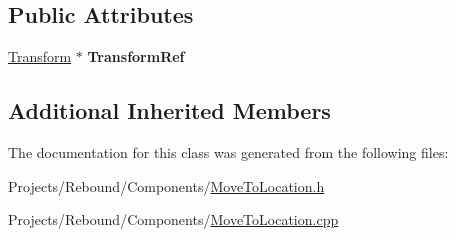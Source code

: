 \subsection*{Public Attributes}
\begin{DoxyCompactItemize}
\item 
\hypertarget{classDCEngine_1_1Components_1_1MoveToLocation_ab4e44d286ef56e30672ea456dd73baa4}{\hyperlink{classDCEngine_1_1Components_1_1Transform}{Transform} $\ast$ {\bfseries Transform\-Ref}}\label{classDCEngine_1_1Components_1_1MoveToLocation_ab4e44d286ef56e30672ea456dd73baa4}

\end{DoxyCompactItemize}
\subsection*{Additional Inherited Members}


The documentation for this class was generated from the following files\-:\begin{DoxyCompactItemize}
\item 
Projects/\-Rebound/\-Components/\hyperlink{MoveToLocation_8h}{Move\-To\-Location.\-h}\item 
Projects/\-Rebound/\-Components/\hyperlink{MoveToLocation_8cpp}{Move\-To\-Location.\-cpp}\end{DoxyCompactItemize}

